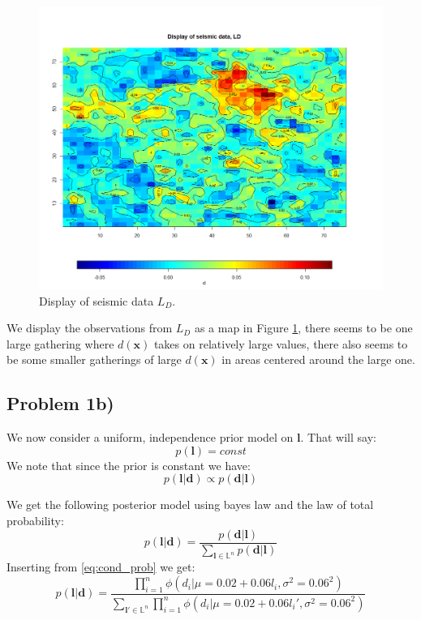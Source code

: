 \documentclass{article}
\newcommand{\vect}[1]{\ensuremath{\boldsymbol{\mathbf{#1}}}}
\begin{document}
	 \begin{figure}[h]	
	 	\begin{center} 
	 		\includegraphics[scale=0.45]{figure1.png}
	 	\end{center}
	 	\caption{Display of seismic data $L_D$.}
	 	\label{fig:1a1} 
	\end{figure}
	 
	 
	 We display the observations from $L_D$ as a map in Figure \ref{fig:1a1}, there seems to be one large gathering where $d(\vect x)$ takes on relatively large values, there also seems to be some smaller gatherings of large $d(\vect x)$ in areas centered around the large one.  

	\newpage
	\subsection*{Problem 1b)}
	We now consider a uniform, independence prior model on $\vect l$. That will say: 
	\begin{equation}
		p(\vect l) = const
	\end{equation}
	We note that since the prior is constant we have:
	\begin{equation}
		p(\vect l | \vect d) \propto p(\vect d | \vect l)
	\end{equation}

	We get the following posterior model using bayes law and the law of total probability: 
	\begin{equation}
		p(\vect l | \vect d) = \dfrac{p(\vect d | \vect l)}{\sum_{\vect l \in \mathbb{L}^n}p(\vect d | \vect l)}
	\end{equation}
	Inserting from \eqref{eq:cond_prob} we get:
	\begin{equation}
		p(\vect l | \vect d) = \dfrac{ \prod_{i=1}^{n}  \phi(d_i |\mu = 0.02 + 0.06l_i, \sigma^2 = 0.06^2)}{\sum_{\vect l' \in \mathbb{L}^n} \prod_{i=1}^{n}  \phi(d_i |\mu = 0.02 + 0.06l_i', \sigma^2 = 0.06^2)}
	\end{equation}
	
\end{document}

